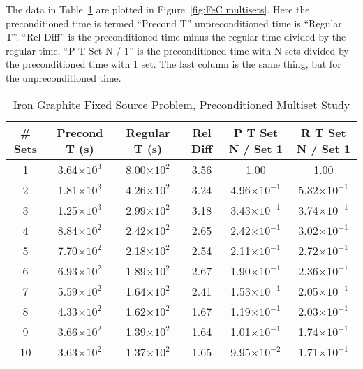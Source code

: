 The data in Table~\ref{table:FeC multisets} are plotted in Figure~\ref{fig:FeC multisets}. Here the preconditioned time is termed ``Precond T''  unpreconditioned time is ``Regular T''. ``Rel Diff'' is the preconditioned time minus the regular time divided by the regular time. ``P T Set N / 1'' is the preconditioned time with N sets divided by the preconditioned time with 1 set. The last column is the same thing, but for the unpreconditioned time.
\begin{table}[!h]
\caption{Iron Graphite Fixed Source Problem, Preconditioned Multiset Study}
\begin{center}
\begin{tabular}{c c c c c c}
\hline
\# Sets & Precond T (s) & Regular T (s) & Rel Diff & P T Set N / Set 1 & R T Set N / Set 1 \\[0.5ex]
\hline
1   & 3.64$\times 10^{3}$  & 8.00$\times 10^{2}$ & 3.56 & 1.00                              & 1.00 \\
2   & 1.81$\times 10^{3}$	& 4.26$\times 10^{2}$ & 3.24 & 4.96$\times 10^{-1}$ & 5.32$\times 10^{-1}$ \\
3   & 1.25$\times 10^{3}$	& 2.99$\times 10^{2}$ & 3.18 & 3.43$\times 10^{-1}$ & 3.74$\times 10^{-1}$ \\
4   & 8.84$\times 10^{2}$	& 2.42$\times 10^{2}$ & 2.65 & 2.42$\times 10^{-1}$ & 3.02$\times 10^{-1}$ \\ 
5   & 7.70$\times 10^{2}$	& 2.18$\times 10^{2}$ & 2.54 & 2.11$\times 10^{-1}$ & 2.72$\times 10^{-1}$ \\
6   & 6.93$\times 10^{2}$	& 1.89$\times 10^{2}$ & 2.67 & 1.90$\times 10^{-1}$ & 2.36$\times 10^{-1}$ \\
7   & 5.59$\times 10^{2}$	& 1.64$\times 10^{2}$ & 2.41 & 1.53$\times 10^{-1}$ & 2.05$\times 10^{-1}$ \\
8   & 4.33$\times 10^{2}$	& 1.62$\times 10^{2}$ & 1.67 & 1.19$\times 10^{-1}$ & 2.03$\times 10^{-1}$ \\
9   & 3.66$\times 10^{2}$	& 1.39$\times 10^{2}$ & 1.64 & 1.01$\times 10^{-1}$ & 1.74$\times 10^{-1}$ \\
10 & 3.63$\times 10^{2}$	& 1.37$\times 10^{2}$ & 1.65 & 9.95$\times 10^{-2}$ & 1.71$\times 10^{-1}$ \\
\hline 
\end{tabular} 
\end{center}
\label{table:FeC multisets}
\end{table}


